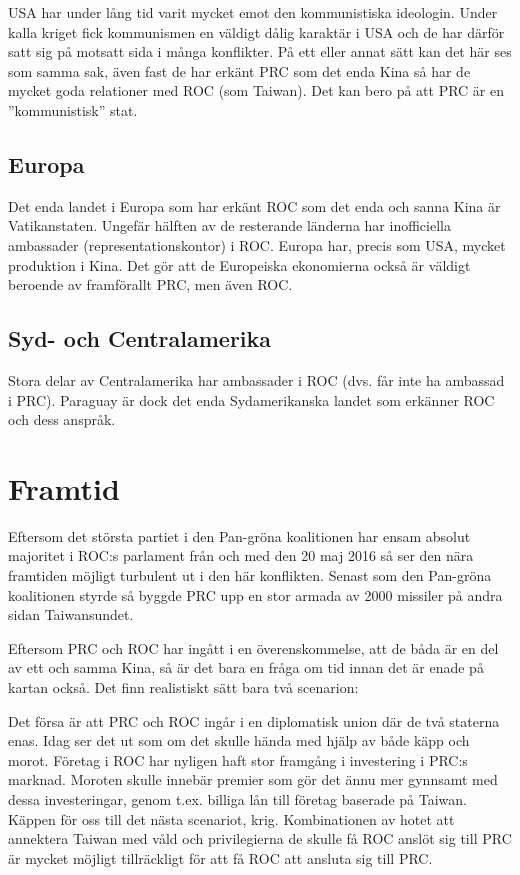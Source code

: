 \documentclass[a4paper,10pt]{article}
\begin{document}
USA har under lång tid varit mycket emot den kommunistiska ideologin. Under kalla kriget fick kommunismen en väldigt dålig karaktär i USA och de har därför satt sig på motsatt sida i många konflikter. På ett eller annat sätt kan det här ses som samma sak, även fast de har erkänt PRC som det enda Kina så har de mycket goda relationer med ROC (som Taiwan). Det kan bero på att PRC är en ''kommunistisk'' stat.

\subsection*{Europa}
Det enda landet i Europa som har erkänt ROC som det enda och sanna Kina är Vatikanstaten. Ungefär hälften av de resterande länderna har inofficiella ambassader (representationskontor) i ROC. Europa har, precis som USA, mycket produktion i Kina. Det gör att de Europeiska ekonomierna också är väldigt beroende av framförallt PRC, men även ROC. 

\subsection*{Syd- och Centralamerika}
Stora delar av Centralamerika har ambassader i ROC (dvs. får inte ha ambassad i PRC). Paraguay är dock det enda Sydamerikanska landet som erkänner ROC och dess anspråk.

\section*{Framtid}
Eftersom det största partiet i den Pan-gröna koalitionen har ensam absolut majoritet i ROC:s parlament från och med den 20 maj 2016 så ser den nära framtiden möjligt turbulent ut i den här konflikten. Senast som den Pan-gröna koalitionen styrde så byggde PRC upp en stor armada av 2000 missiler på andra sidan Taiwansundet.

Eftersom PRC och ROC har ingått i en överenskommelse, att de båda är en del av ett och samma Kina, så är det bara en fråga om tid innan det är enade på kartan också. Det finn realistiskt sätt bara två scenarion:

Det försa är att PRC och ROC ingår i en diplomatisk union där de två staterna enas. Idag ser det ut som om det skulle hända med hjälp av både käpp och morot. Företag i ROC har nyligen haft stor framgång i investering i PRC:s marknad. Moroten skulle innebär premier som gör det ännu mer gynnsamt med dessa investeringar, genom t.ex. billiga lån till företag baserade på Taiwan. Käppen för oss till det nästa scenariot, krig. Kombinationen av hotet att annektera Taiwan med våld och privilegierna de skulle få ROC anslöt sig till PRC är mycket möjligt tillräckligt för att få ROC att ansluta sig till PRC.
\end{document}
